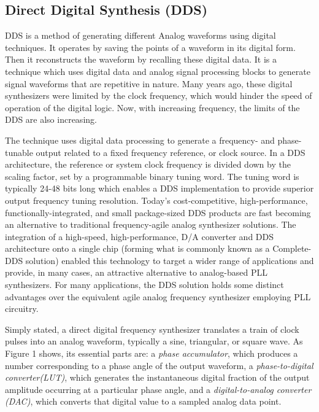 \subsection{Direct Digital Synthesis (DDS)}

DDS is a method of generating different Analog waveforms using digital techniques. It operates by saving the points of a waveform in its digital form. Then it reconstructs the waveform by recalling these digital data. It is a technique which uses digital data and analog signal processing blocks to generate signal waveforms that are repetitive in nature. Many years ago, these digital synthesizers were limited by the clock frequency, which would hinder the speed of operation of the digital logic. Now, with increasing frequency, the limits of the DDS are also increasing.

The technique uses digital data processing to generate a frequency- and phase-tunable output related to a fixed frequency reference, or clock source. In a DDS architecture, the reference or system clock frequency is divided down by the scaling factor, set by a programmable binary tuning word. The tuning word is typically 24-48 bits long which enables a DDS implementation to provide superior output frequency tuning resolution.
Today’s cost-competitive, high-performance, functionally-integrated, and small package-sized DDS products are fast becoming an alternative to traditional frequency-agile analog synthesizer solutions. The integration of a high-speed, high-performance, D/A converter and DDS architecture onto a single chip (forming what is commonly known as a Complete-DDS solution) enabled this technology to target a wider range of applications and provide, in many cases, an attractive alternative to analog-based PLL synthesizers. For many applications, the DDS solution holds some distinct advantages over the equivalent agile analog frequency synthesizer employing PLL circuitry.

Simply stated, a direct digital frequency synthesizer translates a train of clock pulses into an analog waveform, typically a sine, triangular, or square wave. As Figure 1 shows, its essential parts are: a \textit{phase accumulator}, which produces a number corresponding to a phase angle of the output waveform, a \textit{phase-to-digital converter(LUT)}, which generates the instantaneous digital fraction of the output amplitude occurring at a particular phase angle, and a \textit{digital-to-analog converter (DAC)}, which converts that digital value to a sampled analog data point.

